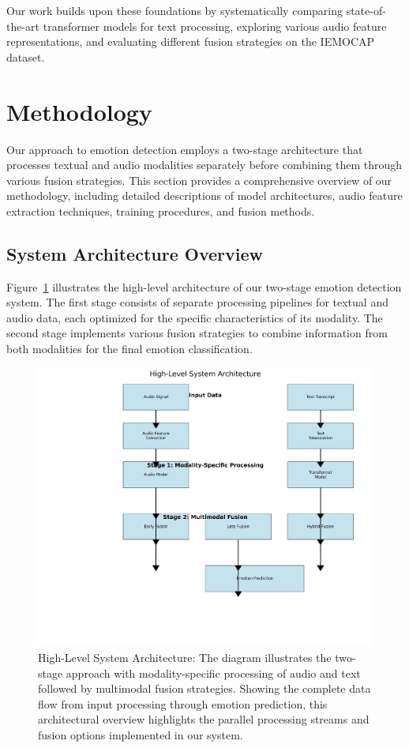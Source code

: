 \documentclass[12pt]{article}
\begin{document}
Our work builds upon these foundations by systematically comparing state-of-the-art transformer models for text processing, exploring various audio feature representations, and evaluating different fusion strategies on the IEMOCAP dataset.

\section{Methodology}
\label{sec:methodology}
Our approach to emotion detection employs a two-stage architecture that processes textual and audio modalities separately before combining them through various fusion strategies. This section provides a comprehensive overview of our methodology, including detailed descriptions of model architectures, audio feature extraction techniques, training procedures, and fusion methods.

\subsection{System Architecture Overview}
Figure~\ref{fig:system_architecture} illustrates the high-level architecture of our two-stage emotion detection system. The first stage consists of separate processing pipelines for textual and audio data, each optimized for the specific characteristics of its modality. The second stage implements various fusion strategies to combine information from both modalities for the final emotion classification.

\begin{figure}[h]
    \centering
    \includegraphics[width=0.9\linewidth]{Figures/system_architecture.png}
    \caption{High-Level System Architecture: The diagram illustrates the two-stage approach with modality-specific processing of audio and text followed by multimodal fusion strategies. Showing the complete data flow from input processing through emotion prediction, this architectural overview highlights the parallel processing streams and fusion options implemented in our system.}
    \label{fig:system_architecture}
\end{figure}
\end{document}
